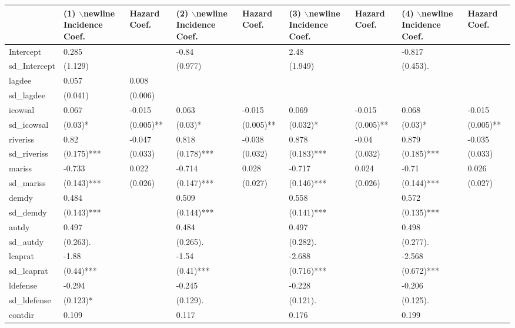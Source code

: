 \begin{table}[ht]
\centering
\begin{tabular}{lllllllll}
  \hline
  & (1) $\backslash$newline Incidence Coef. &  Hazard Coef. & (2) $\backslash$newline Incidence Coef. &  Hazard Coef. & (3) $\backslash$newline Incidence Coef. &  Hazard Coef. & (4) $\backslash$newline Incidence Coef. &  Hazard Coef. \\ 
  \hline
Intercept & 0.285 &  & -0.84 &  & 2.48 &  & -0.817 &  \\ 
  sd\_Intercept & (1.129)  &  & (0.977)  &  & (1.949)  &  & (0.453). &  \\ 
  lagdee & 0.057 & 0.008 &  &  &  &  &  &  \\ 
  sd\_lagdee & (0.041)  & (0.006)  &  &  &  &  &  &  \\ 
  icowsal & 0.067 & -0.015 & 0.063 & -0.015 & 0.069 & -0.015 & 0.068 & -0.015 \\ 
  sd\_icowsal & (0.03)* & (0.005)** & (0.03)* & (0.005)** & (0.032)* & (0.005)** & (0.03)* & (0.005)** \\ 
  riveriss & 0.82 & -0.047 & 0.818 & -0.038 & 0.878 & -0.04 & 0.879 & -0.035 \\ 
  sd\_riveriss & (0.175)*** & (0.033)  & (0.178)*** & (0.032)  & (0.183)*** & (0.032)  & (0.185)*** & (0.033)  \\ 
  mariss & -0.733 & 0.022 & -0.714 & 0.028 & -0.717 & 0.024 & -0.71 & 0.026 \\ 
  sd\_mariss & (0.143)*** & (0.026)  & (0.147)*** & (0.027)  & (0.146)*** & (0.026)  & (0.144)*** & (0.027)  \\ 
  demdy & 0.484 &  & 0.509 &  & 0.558 &  & 0.572 &  \\ 
  sd\_demdy & (0.143)*** &  & (0.144)*** &  & (0.141)*** &  & (0.135)*** &  \\ 
  autdy & 0.497 &  & 0.484 &  & 0.497 &  & 0.498 &  \\ 
  sd\_autdy & (0.263). &  & (0.265). &  & (0.282). &  & (0.277). &  \\ 
  lcaprat & -1.88 &  & -1.54 &  & -2.688 &  & -2.568 &  \\ 
  sd\_lcaprat & (0.44)*** &  & (0.41)*** &  & (0.716)*** &  & (0.672)*** &  \\ 
  ldefense & -0.294 &  & -0.245 &  & -0.228 &  & -0.206 &  \\ 
  sd\_ldefense & (0.123)* &  & (0.129). &  & (0.121). &  & (0.125). &  \\ 
  contdir & 0.109 &  & 0.117 &  & 0.176 &  & 0.199 &  \\ 

\end{tabular}
\end{table}
